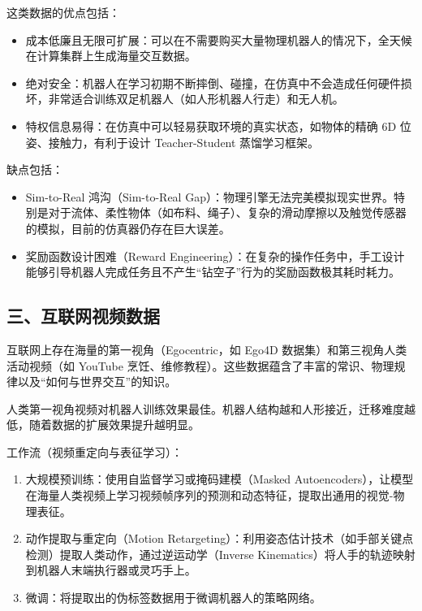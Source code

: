 这类数据的优点包括：

\begin{itemize}
\tightlist
\item
  成本低廉且无限可扩展：可以在不需要购买大量物理机器人的情况下，全天候在计算集群上生成海量交互数据。
\item
  绝对安全：机器人在学习初期不断摔倒、碰撞，在仿真中不会造成任何硬件损坏，非常适合训练双足机器人（如人形机器人行走）和无人机。
\item
  特权信息易得：在仿真中可以轻易获取环境的真实状态，如物体的精确 6D 位姿、接触力，有利于设计 Teacher-Student 蒸馏学习框架。
\end{itemize}

缺点包括：

\begin{itemize}
\tightlist
\item
  Sim-to-Real 鸿沟（Sim-to-Real Gap）：物理引擎无法完美模拟现实世界。特别是对于流体、柔性物体（如布料、绳子）、复杂的滑动摩擦以及触觉传感器的模拟，目前的仿真器仍存在巨大误差。
\item
  奖励函数设计困难（Reward Engineering）：在复杂的操作任务中，手工设计能够引导机器人完成任务且不产生``钻空子''行为的奖励函数极其耗时耗力。
\end{itemize}

\hypertarget{ux4e09ux4e92ux8054ux7f51ux89c6ux9891ux6570ux636e}{%
\subsection{三、互联网视频数据}\label{ux4e09ux4e92ux8054ux7f51ux89c6ux9891ux6570ux636e}}

互联网上存在海量的第一视角（Egocentric，如 Ego4D 数据集）和第三视角人类活动视频（如 YouTube 烹饪、维修教程）。这些数据蕴含了丰富的常识、物理规律以及``如何与世界交互''的知识。

人类第一视角视频对机器人训练效果最佳。机器人结构越和人形接近，迁移难度越低，随着数据的扩展效果提升越明显。

工作流（视频重定向与表征学习）：

\begin{enumerate}
\def\labelenumi{\arabic{enumi}.}
\tightlist
\item
  大规模预训练：使用自监督学习或掩码建模（Masked Autoencoders），让模型在海量人类视频上学习视频帧序列的预测和动态特征，提取出通用的视觉-物理表征。
\item
  动作提取与重定向（Motion Retargeting）：利用姿态估计技术（如手部关键点检测）提取人类动作，通过逆运动学（Inverse Kinematics）将人手的轨迹映射到机器人末端执行器或灵巧手上。
\item
  微调：将提取出的伪标签数据用于微调机器人的策略网络。
\end{enumerate}

